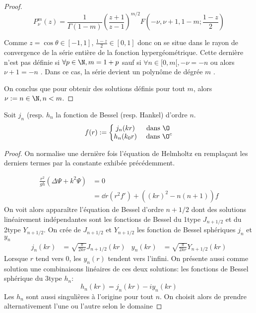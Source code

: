 \begin{proof}
{\[
P^m_\nu(z) = \frac{1}{\Gamma\left(1-m\right)}\left(\frac{z+1}{z-1}\right)^{m/2}F\left(-\nu,\nu+1,1-m;\frac{1-z}{2}\right)
\]

Comme $z=\cos\theta \in [-1,1] $, $\frac{1-z}{2} \in [0,1]$ donc on se situe dans le rayon de convergence de la série entière de la fonction hypergéométrique. Cette dernière n'est pas définie si $\forall p\in \N, m=1+p $ sauf si $\forall n \in [0,m[, -\nu = -n $ ou alors $ \nu +1 = -n $ \cite[p.~556]{abramowitz_handbook_1964}. Dans ce cas, la série devient un polynôme de dégrée $m$ \cite[p.~561]{abramowitz_handbook_1964}.

On conclus que pour obtenir des solutions définis pour tout $m$, alors $\nu:=n \in \N, n< m $.
}


\end{proof}


\begin{prop} Soit $j_n$ (resp. $h_n$ la fonction de Bessel (resp. Hankel) d'ordre $n$.
  \begin{equation}
    f(r) := \left\lbrace
    \begin{matrix}
    j_n(kr) & \text{ dans $\O$ } \\
    h_n(k_0r) & \text{ dans } \O^c \\
    \end{matrix}\right.
  \end{equation}
\end{prop}
\begin{proof}
On normalise une dernière fois l'équation de Helmholtz en remplaçant les derniers termes par la constante exhibée précédemment.

\begin{align*}
\frac{r^2}{gh} \left(\Delta \Psi + k^2 \Psi\right) &= 0 \\
&= \dd{r}{\left(r^2f'\right)} + \left((kr)^2 - n(n+1)\right)f
\end{align*}
  On voit alors apparaître l'équation de Bessel d'ordre $n +1/2$ dont des solutions linéairement indépendantes sont les fonctions de Bessel du 1\ier type $J_{n+1/2}$ et du 2\ieme type $Y_{n+1/2}$\cite[p.~86]{bohren_absorption_2004}\cite[p.~1465]{morse_methods_1953}. 
  On crée de $J_{n+1/2}$ et $Y_{n+1/2}$ les fonction de Bessel sphériques $j_n$ et $y_n$ 
  \begin{align*}
  j_n(kr) &= \sqrt{\frac{\pi}{2kr}}J_{n+1/2}(kr) &
  y_n(kr) &= \sqrt{\frac{\pi}{2kr}}Y_{n+1/2}(kr)
  \end{align*}
  Lorsque $r$ tend vers $0$, les $y_n(r)$ tendent vers l'infini. On présente aussi comme solution une combinaisons linéaires de ces deux solutions: les fonctions de Bessel sphérique du 3\ieme type $h_n$:
  \[
  h_n(kr)=j_n(kr)-i y_n(kr)
  \]
  Les $h_n$ sont aussi singulières à l'origine pour tout $n$. On choisit alors de prendre alternativement l'une ou l'autre selon le domaine
  \end{proof}


